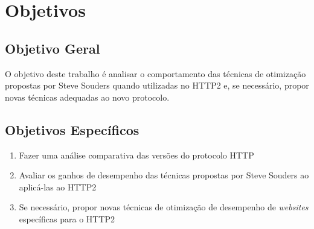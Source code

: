 %
%

\chapter{Objetivos}
\section{Objetivo Geral}
\label{sec:obj-geral}
O objetivo deste trabalho é analisar o comportamento das técnicas de otimização propostas por Steve Souders quando utilizadas no HTTP2 e, se necessário, propor novas técnicas adequadas ao novo protocolo.

\section{Objetivos Específicos}
\label{sec:obj-espec}
\begin{enumerate}
\item Fazer uma análise comparativa das versões do protocolo HTTP
\item Avaliar os ganhos de desempenho das técnicas propostas por Steve Souders ao aplicá-las ao HTTP2
\item Se necessário, propor novas técnicas de otimização de desempenho de \textit{websites} específicas para o HTTP2
\end{enumerate}

